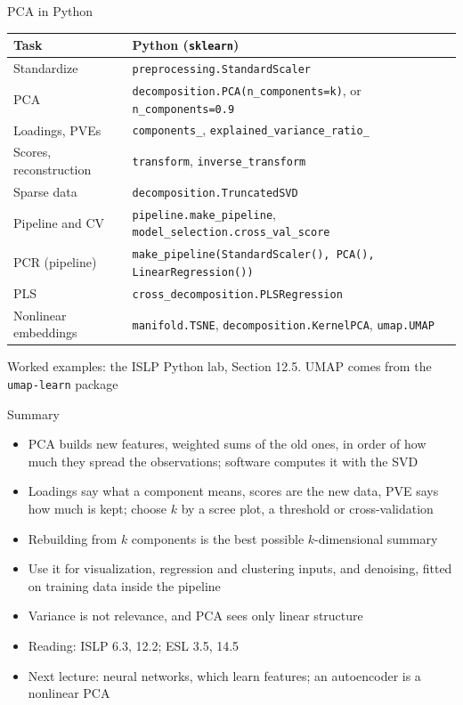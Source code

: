 \begin{frame}{PCA in Python}
    \centering
    \scriptsize
    \begin{tabular}{@{}l l@{}}
        \toprule
        Task & Python (\texttt{sklearn}) \\
        \midrule
        Standardize & \texttt{preprocessing.StandardScaler} \\
        PCA & \texttt{decomposition.PCA(n\_components=k)}, or \texttt{n\_components=0.9} \\
        Loadings, PVEs & \texttt{components\_}, \texttt{explained\_variance\_ratio\_} \\
        Scores, reconstruction & \texttt{transform}, \texttt{inverse\_transform} \\
        Sparse data & \texttt{decomposition.TruncatedSVD} \\
        Pipeline and CV & \texttt{pipeline.make\_pipeline}, \texttt{model\_selection.cross\_val\_score} \\
        PCR (pipeline) & \texttt{make\_pipeline(StandardScaler(), PCA(), LinearRegression())} \\
        PLS & \texttt{cross\_decomposition.PLSRegression} \\
        Nonlinear embeddings & \texttt{manifold.TSNE}, \texttt{decomposition.KernelPCA}, \texttt{umap.UMAP} \\
        \bottomrule
    \end{tabular}

    \svspace{0.5em}
    Worked examples: the ISLP Python lab, Section 12.5. UMAP comes from the \texttt{umap-learn} package
\end{frame}

\begin{frame}{Summary}
    \begin{itemize}
        \item PCA builds new features, weighted sums of the old ones, in order of how much they spread the observations; software computes it with the SVD
        \item Loadings say what a component means, scores are the new data, PVE says how much is kept; choose $k$ by a scree plot, a threshold or cross-validation
        \item Rebuilding from $k$ components is the best possible $k$-dimensional summary
        \item Use it for visualization, regression and clustering inputs, and denoising, fitted on training data inside the pipeline
        \item Variance is not relevance, and PCA sees only linear structure
        \item Reading: ISLP 6.3, 12.2; ESL 3.5, 14.5
        \item Next lecture: neural networks, which learn features; an autoencoder is a nonlinear PCA
    \end{itemize}
\end{frame}

